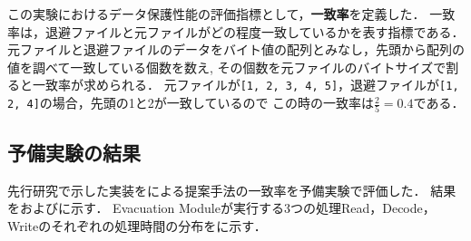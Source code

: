 この実験におけるデータ保護性能の評価指標として，\textbf{一致率}を定義した．
一致率は，退避ファイルと元ファイルがどの程度一致しているかを表す指標である．
元ファイルと退避ファイルのデータをバイト値の配列とみなし，先頭から配列の値を調べて一致している個数を数え,
その個数を元ファイルのバイトサイズで割ると一致率が求められる．
元ファイルが\texttt{[1, 2, 3, 4, 5]}，退避ファイルが\texttt{[1, 2, 4]}の場合，先頭の1と2が一致しているので
この時の一致率は$\frac{2}{5}=0.4$である．

\subsection{予備実験の結果}
\label{subsec:preliminary-result}
先行研究\cite{css2024}で示した実装をによる提案手法の一致率を予備実験で評価した．
結果をおよびに示す．
Evacuation Moduleが実行する3つの処理Read，Decode，Writeのそれぞれの処理時間の分布をに示す．
